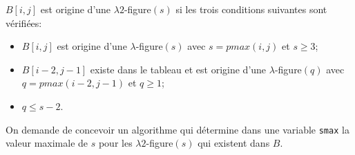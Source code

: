 \documentclass[a4paper,10pt]{article}
\begin{document}
$B[i,j]$ est origine d'une $\lambda 2$-figure$(s)$ si les trois conditions suivantes sont vérifiées:
\begin{itemize}
\item $B[i,j]$ est origine d'une $\lambda$-figure$(s)$ avec $s=pmax(i,j)$ et $s\geq3$;
\item $B[i-2,j-1]$ existe dans le tableau et est origine d'une $\lambda$-figure$(q)$ avec $q=pmax(i-2,j-1)$ et $q\geq1$;
\item $q \leq s-2$.
\end{itemize}

On demande de concevoir un algorithme qui détermine  dans une variable \texttt{smax} la valeur maximale de $s$ pour les $\lambda 2$-figure$(s)$ qui existent dans $B$.







\end{document}
